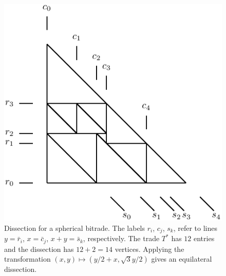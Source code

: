 \documentclass[12pt,amstags,fleqn]{article}
\theoremstyle{plain}
\theoremstyle{definition}
\theoremstyle{definition}
\def\ll{{\textstyle \ast}}
\newcommand{\opa}{\ll}
\begin{document}
\begin{figure}[htbp]
\begin{center}
\includegraphics[scale=0.75]{dissection31}
\end{center}
\caption{Dissection for a spherical bitrade. The labels $r_i$, $c_j$,
$s_k$, refer to lines $y = \bar r_i$,
$x = \bar c_j$,
$x+y = \bar s_k$, respectively. The trade $T^{\opa}$ has $12$ entries
and the dissection has $12 + 2 = 14$ vertices.
Applying the transformation $(x,y) \mapsto (y/2 + x, \sqrt 3 y/2)$ gives
an equilateral dissection.}
\label{fg2}
\end{figure} 
\end{document}
